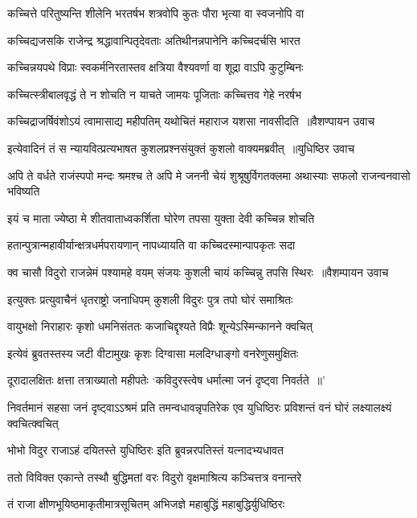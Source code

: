 \twolineshloka
{कच्चित्ते परितुष्यन्ति शीलेनि भरतर्षभ}
{शत्रवोपि कुतः पौरा भृत्या वा स्वजनोपि वा}


\twolineshloka
{कच्चिद्यजसकि राजेन्द्र श्रद्धावान्पितृदेवताः}
{अतिथीनन्नपानेनि कच्चिदर्चसि भारत}


\twolineshloka
{कच्चिन्नयपथे विप्राः स्वकर्मनिरतास्तव}
{क्षत्रिया वैश्यवर्णा वा शूद्रा वाऽपि कुटुम्बिनः}


\twolineshloka
{कच्चित्स्त्रीबालवृद्धं ते न शोचति न याचते}
{जामयः पूजिताः कच्चित्तव गेहे नरर्षभ}


\threelineshloka
{कच्चिद्राजर्षिवंशोऽयं त्वामासाद्य महीपतिम्}
{यथोचितं महाराज यशसा नावसीदति ॥वैशण्पायन उवाच}
{}


\threelineshloka
{इत्येवादिनं तं स न्यायवित्प्रत्यभाषत}
{कुशलप्रश्नसंयुक्तं कुशलो वाक्यमब्रवीत् ॥युधिष्ठिर उवाच}
{}


अपि ते वर्धते राजंस्पपो मन्दः श्रमश्च ते
\twolineshloka
{अपि मे जननी चेयं शुश्रूषुर्विगतक्लमा}
{अथास्याः सफलो राजन्वनवासो भविष्यति}


\twolineshloka
{इयं च माता ज्येष्ठा मे शीतवाताध्वकर्शिता}
{घोरेण तपसा युक्ता देवी कच्चिन्न शोचति}


\twolineshloka
{हतान्पुत्रान्महावीर्यान्क्षत्रधर्मपरायणान्}
{नापध्यायति वा कच्चिदस्मान्पापकृतः सदा}


\threelineshloka
{क्व चासौ विदुरो राजन्नेमं पश्यामहे वयम्}
{संजयः कुशली चायं कच्चिन्नु तपसि स्थिरः ॥वैशम्पायन उवाच}
{}


\twolineshloka
{इत्युक्तः प्रत्युवाचैनं धृतराष्ट्रो जनाधिपम्}
{कुशली विदुरः पुत्र तपो घोरं समाश्रितः}


\twolineshloka
{वायुभक्षो निराहारः कृशो धमनिसंततः}
{कजाचिद्दृश्यते विप्रैः शून्येऽस्मिन्कानने क्वचित्}


\twolineshloka
{इत्येवं ब्रुवतस्तस्य जटी वीटामुखः कृशः}
{दिग्वासा मलदिग्धाङ्गो वनरेणुसमुक्षितः}


\twolineshloka
{दूरादालक्षितः क्षत्ता तत्राख्यातो महीपतेः}
{`कविदुरस्त्वेष धर्मात्मा जनं दृष्ट्वा निवर्तते ॥'}


\threelineshloka
{निवर्तमानं सहसा जनं दृष्ट्वाऽऽश्रमं प्रति}
{तमन्वधावन्नृपतिरेक एव युधिष्ठिरः}
{प्रविशन्तं वनं घोरं लक्ष्यालक्ष्यं क्वचित्क्वचित्}


\twolineshloka
{भोभो विदुर राजाऽहं दयितस्ते युधिष्ठिरः}
{इति ब्रुवन्नरपतिस्तं यत्नादभ्यधावत}


\twolineshloka
{ततो विविक्त एकान्ते तस्थौ बुद्धिमतां वरः}
{विदुरो वृक्षमाश्रित्य कञ्चित्तत्र वनान्तरे}


\twolineshloka
{तं राजा क्षीणभूयिष्ठमाकृतीमात्रसूचितम्}
{अभिजज्ञे महाबुद्धिं महाबुद्धिर्युधिष्ठिरः}


